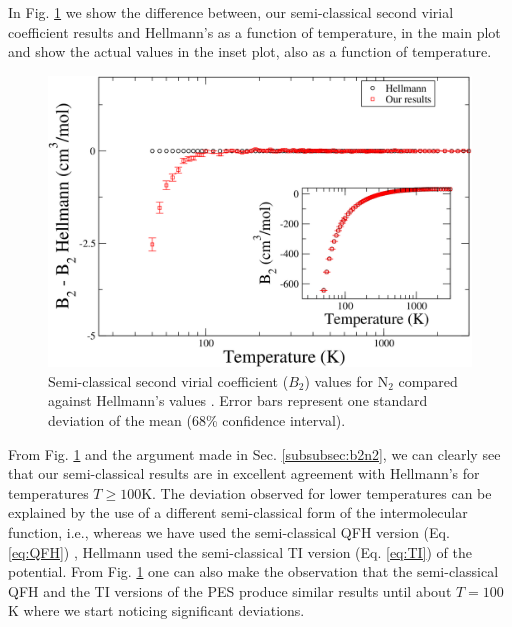         In Fig. \ref{fig:B2SCN2} we show the difference between, our semi-classical second virial coefficient results and Hellmann's as a function of temperature, in the main plot and show the actual values in the inset plot, also as a function of temperature.
        \begin{figure}[!htbp]
            \centering
            \includegraphics[scale=0.20,keepaspectratio]{Chapter-5/Figures/B2SC9sResultsAll.png}
            \caption{Semi-classical second virial coefficient ($B_2$) values for N$_2$ compared against Hellmann's values \cite{Hellmann2013}. Error bars represent one standard deviation of the mean (68\% confidence interval). }
            \label{fig:B2SCN2}
        \end{figure}
        From Fig. \ref{fig:B2SCN2} and the argument made in Sec. \ref{subsubsec:b2n2}, we can clearly see that our semi-classical results are in excellent agreement with Hellmann's for temperatures $T \ge 100$K. The deviation observed for lower temperatures can be explained by the use of a different semi-classical form of the intermolecular function, i.e., whereas we have used the semi-classical QFH version (Eq. \eqref{eq:QFH}) , Hellmann used the semi-classical TI version (Eq. \eqref{eq:TI}) of the \abinitio{} potential. From Fig. \ref{fig:B2SCN2} one can also make the observation that the semi-classical QFH and the TI versions of the \abinitio{} PES produce similar results until about $T = 100$K where we start noticing significant deviations.

